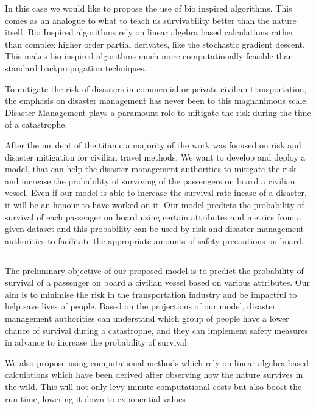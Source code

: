 \documentclass[12pt]{article}
\newcommand{\nd}{\noindent}
\newcommand{\subsize}{\fontsize{14pt}{12pt}\selectfont}
\begin{document}
\nd In this case we would like to propose the use of bio inspired algorithms. This comes as an analogue to what to teach us survivability better than the nature itself. Bio Inspired algorithms rely on linear algebra based calculations rather than complex higher order partial derivates, like the stochastic gradient descent. This makes bio inspired algorithms much more computationally feasible than standard backpropogation techniques. 

\nd To mitigate the risk of disasters in commercial or private civilian transportation, the emphasis on disaster management has never been to this magnanimous scale. Disaster Management plays a paramount role to mitigate the risk during the time of a catastrophe. 

\nd After the incident of the titanic a majority of the work was focused on risk and disaster mitigation for civilian travel methods. We want to develop and deploy a model, that can help the disaster management authorities to mitigate the risk and increase the probability of surviving of the passengers on board a civilian vessel. Even if our model is able to increase the survival rate incase of a disaster, it will be an honour to have worked on it. Our model predicts the probability of survival of each passenger on board using certain attributes and metrics from a given dataset and this probability can be used by risk and disaster management authorities to facilitate the appropriate amounts of safety precautions on board.

\newpage

\subsection{\textbf{\subsize{OBJECTIVE}}}
The preliminary objective of our proposed model is to predict the probability of survival of a passenger on board a civilian vessel based on various attributes. Our aim is to minimise the risk in the transportation industry and be impactful to help save lives of people. Based on the projections of our model, disaster management authorities can understand which group of people have a lower chance of survival during a catastrophe, and they can implement safety measures in advance to increase the probability of survival 

\nd We also propose using computational methods which rely on linear algebra based calculations which have been derived after observing how the nature survives in the wild. This will not only levy minute computational costs but also boost the run time, lowering it down to exponential values 
\end{document}
